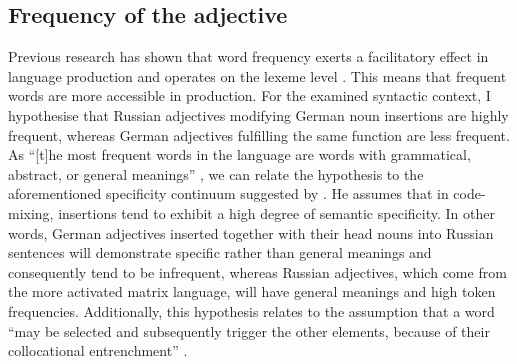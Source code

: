 \subsection{Frequency of the adjective}\label{section_fr_adj}
Previous research has shown that word frequency exerts a facilitatory effect in language production \citep{oldfield-wingfield} and operates on the lexeme level \citep{jeschiniak-levelt}. This means that frequent words are more accessible in production. For the examined syntactic context, I hypothesise that Russian adjectives modifying German noun insertions are highly frequent, whereas German adjectives fulfilling the same function are less frequent. As ``[t]he most frequent words in the language are words with grammatical, abstract, or general meanings'' \citep[][88]{richards-1970}, we can relate the hypothesis to the aforementioned specificity continuum suggested by \citet{backus-two-1996, backus-2001}. He assumes that in code-mixing, insertions tend to exhibit a high degree of semantic specificity. In other words, German adjectives inserted together with their head nouns into Russian sentences will demonstrate specific rather than general meanings and consequently tend to be infrequent, whereas Russian adjectives, which come from the more activated matrix language, will have general meanings and high token frequencies. Additionally, this hypothesis relates to the assumption that a word ``may be selected and subsequently trigger the other elements, because of their collocational entrenchment'' \citep[126]{backus-two-1996}.


